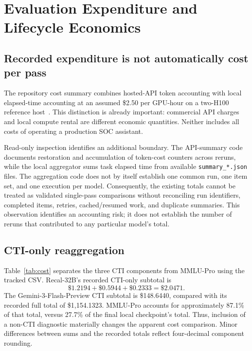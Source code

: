 \documentclass[journal]{IEEEtran}
\newcommand{\code}[1]{{\small\nolinkurl{#1}}}
\begin{document}
\section{Evaluation Expenditure and Lifecycle Economics}\label{sec:cost}
\subsection{Recorded expenditure is not automatically cost per pass}
The repository cost summary combines hosted-API token accounting with local elapsed-time accounting at an assumed \$2.50 per GPU-hour on a two-H100 reference host~\cite{glaukopis2026software}. This distinction is already important: commercial API charges and local compute rental are different economic quantities. Neither includes all costs of operating a production SOC assistant.

Read-only inspection identifies an additional boundary. The API-summary code documents restoration and accumulation of token-cost counters across reruns, while the local aggregator sums task elapsed time from available \code{summary_*.json} files. The aggregation code does not by itself establish one common run, one item set, and one execution per model. Consequently, the existing totals cannot be treated as validated single-pass comparisons without reconciling run identifiers, completed items, retries, cached/resumed work, and duplicate summaries. This observation identifies an accounting risk; it does not establish the number of reruns that contributed to any particular model's total.

\subsection{CTI-only reaggregation}
Table~\ref{tab:cost} separates the three CTI components from MMLU-Pro using the tracked CSV. Recal-32B's recorded CTI-only subtotal is
\begin{equation}
 \$1.2194+\$0.5944+\$0.2333=\$2.0471.
\end{equation}
The Gemini-3-Flash-Preview CTI subtotal is \$148.6440, compared with its recorded full total of \$1,154.1323. MMLU-Pro accounts for approximately 87.1\% of that total, versus 27.7\% of the final local checkpoint's total. Thus, inclusion of a non-CTI diagnostic materially changes the apparent cost comparison. Minor differences between sums and the recorded totals reflect four-decimal component rounding.
\end{document}
